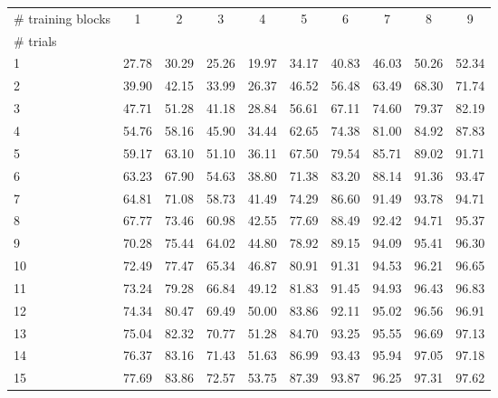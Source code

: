 \begin{tabular}{@{}lccccccccc@{}}
\toprule
\# training blocks & 1 & 2 & 3 & 4 & 5 & 6 & 7 & 8 & 9 \\
\# trials &  &  &  &  &  &  &  &  &  \\
\midrule
1 & 27.78 & 30.29 & 25.26 & 19.97 & 34.17 & 40.83 & 46.03 & 50.26 & 52.34 \\
2 & 39.90 & 42.15 & 33.99 & 26.37 & 46.52 & 56.48 & 63.49 & 68.30 & 71.74 \\
3 & 47.71 & 51.28 & 41.18 & 28.84 & 56.61 & 67.11 & 74.60 & 79.37 & 82.19 \\
4 & 54.76 & 58.16 & 45.90 & 34.44 & 62.65 & 74.38 & 81.00 & 84.92 & 87.83 \\
5 & 59.17 & 63.10 & 51.10 & 36.11 & 67.50 & 79.54 & 85.71 & 89.02 & 91.71 \\
6 & 63.23 & 67.90 & 54.63 & 38.80 & 71.38 & 83.20 & 88.14 & 91.36 & 93.47 \\
7 & 64.81 & 71.08 & 58.73 & 41.49 & 74.29 & 86.60 & 91.49 & 93.78 & 94.71 \\
8 & 67.77 & 73.46 & 60.98 & 42.55 & 77.69 & 88.49 & 92.42 & 94.71 & 95.37 \\
9 & 70.28 & 75.44 & 64.02 & 44.80 & 78.92 & 89.15 & 94.09 & 95.41 & 96.30 \\
10 & 72.49 & 77.47 & 65.34 & 46.87 & 80.91 & 91.31 & 94.53 & 96.21 & 96.65 \\
11 & 73.24 & 79.28 & 66.84 & 49.12 & 81.83 & 91.45 & 94.93 & 96.43 & 96.83 \\
12 & 74.34 & 80.47 & 69.49 & 50.00 & 83.86 & 92.11 & 95.02 & 96.56 & 96.91 \\
13 & 75.04 & 82.32 & 70.77 & 51.28 & 84.70 & 93.25 & 95.55 & 96.69 & 97.13 \\
14 & 76.37 & 83.16 & 71.43 & 51.63 & 86.99 & 93.43 & 95.94 & 97.05 & 97.18 \\
15 & 77.69 & 83.86 & 72.57 & 53.75 & 87.39 & 93.87 & 96.25 & 97.31 & 97.62 \\
\bottomrule
\end{tabular}
